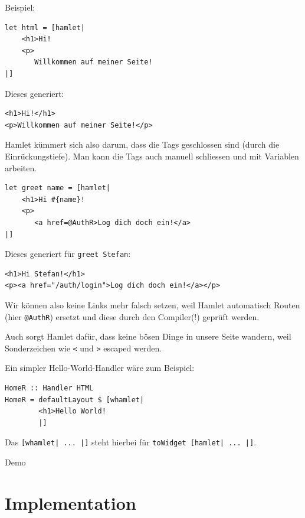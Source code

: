 \documentclass{beamer}
\begin{document}
\begin{frame}[fragile]
Beispiel:\\\par
\begin{verbatim}
let html = [hamlet|
    <h1>Hi!
    <p>
       Willkommen auf meiner Seite!
|]
\end{verbatim}
\pause
Dieses generiert:
\begin{verbatim}
<h1>Hi!</h1>
<p>Willkommen auf meiner Seite!</p>
\end{verbatim}
\pause
Hamlet kümmert sich also darum, dass die Tags geschlossen sind (durch die Einrückungstiefe). Man kann die Tags auch manuell schliessen und mit Variablen arbeiten.
\end{frame}

\begin{frame}[fragile]
\begin{verbatim}
let greet name = [hamlet|
    <h1>Hi #{name}!
    <p>
       <a href=@AuthR>Log dich doch ein!</a>
|]
\end{verbatim}
\pause
Dieses generiert für \texttt{greet \glqq Stefan\grqq}:
\begin{verbatim}
<h1>Hi Stefan!</h1>
<p><a href="/auth/login">Log dich doch ein!</a></p>
\end{verbatim}
\pause
Wir können also keine Links mehr falsch setzen, weil Hamlet automatisch Routen (hier \texttt{@AuthR}) ersetzt und diese durch den Compiler(!) geprüft werden.\\\pause\par
Auch sorgt Hamlet dafür, dass keine bösen Dinge in unsere Seite wandern, weil Sonderzeichen wie \texttt{<} und \texttt{>} escaped werden.
\end{frame}

\begin{frame}[fragile]
Ein simpler Hello-World-Handler wäre zum Beispiel:
\bigskip

\begin{verbatim}
HomeR :: Handler HTML
HomeR = defaultLayout $ [whamlet|
        <h1>Hello World!
        |]
\end{verbatim}
\pause
\bigskip

Das \texttt{[whamlet| ... |]} steht hierbei für \texttt{toWidget [hamlet| ... |]}.
\end{frame}

\begin{frame}
Demo
\end{frame}


\section{Implementation}
\end{document}
